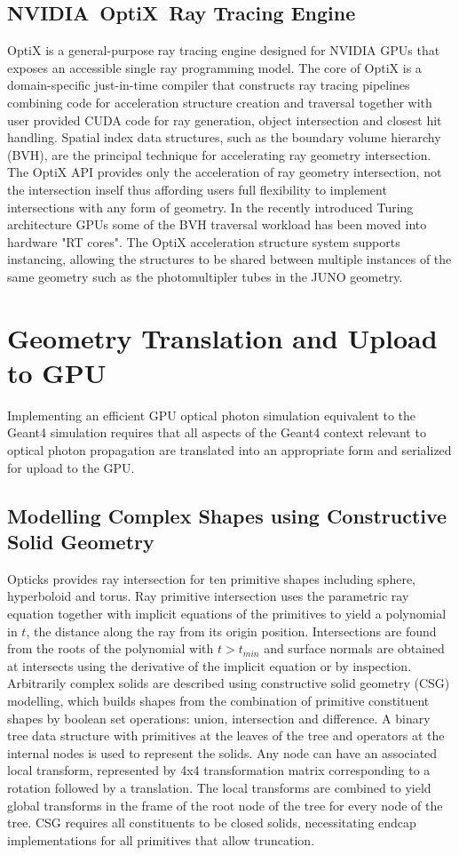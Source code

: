 \documentclass{webofc}
\begin{document}
\subsection{NVIDIA\textregistered\ OptiX\texttrademark\ Ray Tracing Engine}
%
OptiX\cite{optixPaper}\cite{optixSite} is a general-purpose ray tracing engine
designed for NVIDIA GPUs that exposes an accessible single ray programming model.
The core of OptiX is a domain-specific just-in-time compiler that constructs 
ray tracing pipelines combining code for acceleration structure creation and traversal 
together with user provided CUDA code for ray generation, object intersection and closest hit handling.
Spatial index data structures, such as the boundary volume hierarchy (BVH), are the 
principal technique for accelerating ray geometry intersection.  The OptiX API\cite{optixDocs} 
provides only the acceleration of ray geometry intersection, not the intersection inself 
thus affording users full flexibility to implement intersections with any form of geometry. In the recently introduced Turing 
architecture GPUs some of the BVH traversal workload has been moved into hardware "RT cores".
The OptiX acceleration structure system supports instancing, allowing the structures to be shared 
between multiple instances of the same geometry such as the photomultipler tubes in the JUNO geometry.  
%
\section{Geometry Translation and Upload to GPU}
\label{geometry}
%
Implementing an efficient GPU optical photon simulation equivalent to the Geant4 simulation 
requires that all aspects of the Geant4 context relevant to optical photon propagation are 
translated into an appropriate form and serialized for upload to the GPU.
%
\subsection{Modelling Complex Shapes using Constructive Solid Geometry}
%
Opticks provides ray intersection for ten primitive shapes including sphere, hyperboloid and torus.
Ray primitive intersection uses the parametric ray equation together with implicit equations 
of the primitives to yield a polynomial in $t$, the distance along the ray from its origin position. 
Intersections are found from the roots of the polynomial with $t > t_{min}$ and surface normals are obtained at intersects
using the derivative of the implicit equation or by inspection.
%
Arbitrarily complex solids are described using constructive solid geometry (CSG) modelling, 
which builds shapes from the combination of primitive constituent shapes by boolean set operations: union, intersection and difference.
A binary tree data structure with primitives at the leaves of the tree and operators at the internal nodes is used
to represent the solids. Any node can have an associated local transform, represented by 4x4 transformation matrix corresponding 
to a rotation followed by a translation. The local transforms are combined to yield global transforms in the frame of the root node of the tree
for every node of the tree. CSG requires all constituents to be closed solids, necessitating 
endcap implementations for all primitives that allow truncation. 
%
\end{document}

